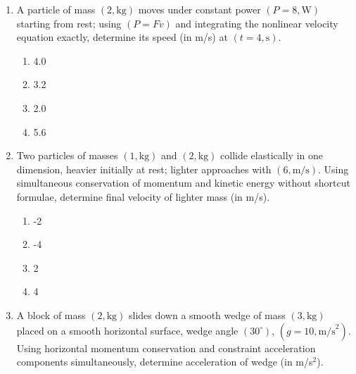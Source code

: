 \documentclass[12pt]{article}
\begin{document}
\begin{enumerate}
\item A particle of mass $(2,\text{kg})$ moves under constant power $(P=8,\text{W})$ starting from rest; using $(P=Fv)$ and integrating the nonlinear velocity equation exactly, determine its speed (in m/s) at $(t=4,\text{s})$.

\begin{enumerate}[label=\Alph*)]
\item 4.0
\item 3.2
\item 2.0
\item 5.6
\end{enumerate}

\item Two particles of masses $(1,\text{kg})$ and $(2,\text{kg})$ collide elastically in one dimension, heavier initially at rest; lighter approaches with $(6,\text{m/s})$. Using simultaneous conservation of momentum and kinetic energy without shortcut formulae, determine final velocity of lighter mass (in m/s).

\begin{enumerate}[label=\Alph*)]
\item -2
\item -4
\item 2
\item 4
\end{enumerate}

\item A block of mass $(2,\text{kg})$ slides down a smooth wedge of mass $(3,\text{kg})$ placed on a smooth horizontal surface, wedge angle $(30^\circ)$, $(g=10,\text{m/s}^2)$. Using horizontal momentum conservation and constraint acceleration components simultaneously, determine acceleration of wedge (in m/s$^2$).




\begin{center}
\end{center}
\end{enumerate}
\end{document}
